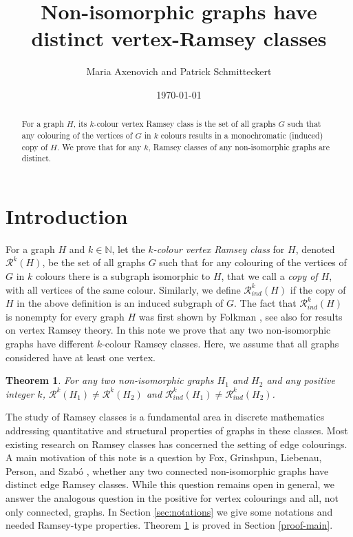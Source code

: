 \documentclass[11pt]{article}
\title{Non-isomorphic graphs have distinct vertex-Ramsey classes}
\author{Maria Axenovich and Patrick Schmitteckert \affiliation{Institute of Algebra and Geometry, Karlsruhe Institute of Technology, Germany (\textsf{\href{mailto:maria.aksenovich@kit.edu}{maria.aksenovich@kit.edu}, \textsf{\href{mailto:patrick@schmitteckert.org}{patrick@schmitteckert.org})}}}}
\date{\today}
\theoremstyle{plain}
\newtheorem{theorem}{Theorem}[section]
\theoremstyle{definition}
\newcommand{\R}{\mathcal{R}}
\newcommand{\bN}{\mathbb{N}}
\newcommand{\Rk}{\R_{ind}}
\begin{document}
    \maketitle

    \begin{abstract}
        For a graph $H$,  its $k$-colour  vertex Ramsey class is the set of all graphs $G$ such that any colouring of the  vertices of $G$ in $k$ colours results in a monochromatic (induced) copy of $H$. 
        We prove that for any $k$,  Ramsey classes of any  non-isomorphic graphs are distinct. 
            \end{abstract}
    
    \section{Introduction}
  For a graph $H$ and $k\in \bN$, let  the {\it $k$-colour vertex Ramsey class} for $H$, denoted $\R^k(H)$,  be the set of all graphs  $G$ such that for any colouring of the vertices of $G$ in $k$ colours there is a subgraph isomorphic to $H$, that we call a {\it copy of $H$},  with all vertices of the same colour.   Similarly, we define  $\R_{ind}^k(H)$ if the copy of $H$ in the above definition is an induced subgraph of $G$.  
  The fact that  $\Rk^k(H)$ is nonempty for every graph $H$ was first shown by Folkman \cite{Folk}, see also \cite{BR, DHKZ, LRV, NR} for results on vertex Ramsey theory. 
  In this note we prove that any two non-isomorphic graphs have different $k$-colour Ramsey classes. Here, we assume that all graphs considered   have at least one vertex.
 
 \begin{theorem}\label{main}
 For any two   non-isomorphic graphs  $H_1$ and $H_2$ and  any  positive integer $k$,   $\R^k(H_1) \neq \R^k(H_2)$ and $\R_{ind}^k(H_1) \neq \R_{ind}^k(H_2)$.
 \end{theorem}
 
 
The study of Ramsey classes is a fundamental area in discrete mathematics addressing quantitative and structural properties of graphs in these classes.
Most existing  research  on Ramsey classes has concerned the setting of  edge colourings. A main motivation of this note is a question by  Fox,  Grinshpun, Liebenau, Person, and Szab\'o \cite{F}, whether any two connected non-isomorphic graphs have distinct edge Ramsey classes. While this question remains open in general,  we answer the  analogous question in the positive  for vertex colourings and all, not only connected, graphs. In Section \ref{sec:notations} we give some notations and needed Ramsey-type properties. Theorem \ref{main} is proved in Section \ref{proof-main}.
\end{document}
